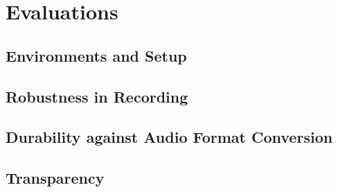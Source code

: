 \chapter{Evaluations}

\section{Environments and Setup}


\section{Robustness in Recording}


\section{Durability against Audio Format Conversion}


\section{Transparency}

